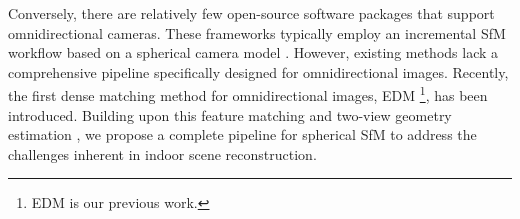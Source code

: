 Conversely, there are relatively few open-source software packages \cite{moulon2017openmvg,jiang20243d} that support omnidirectional cameras. 
These frameworks typically employ an incremental SfM workflow based on a spherical camera model \cite{jiang20243d}. 
However, existing methods lack a comprehensive pipeline specifically designed for omnidirectional images. 
Recently, the first dense matching method for omnidirectional images, EDM \cite{EDM}\footnote{EDM is our previous work.}, has been introduced. 
Building upon this feature matching and two-view geometry estimation \cite{solarte2021robust}, we propose a complete pipeline for spherical SfM to address the challenges inherent in indoor scene reconstruction.


